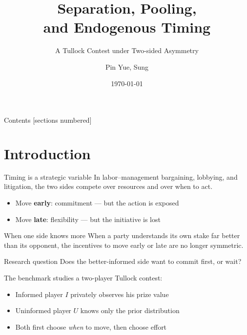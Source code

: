 \documentclass[10pt]{beamer}
\title{Separation, Pooling,\\ and Endogenous Timing}
\subtitle{A Tullock Contest under Two-sided Asymmetry}
\date{\today}
\author{Pin Yue, Sung}
\institute{Dept. of International Business, National Chengchi University}
\let\focusoldcitet\citet
\renewcommand{\citet}[1]{\textcolor{alert}{\focusoldcitet{#1}}}%
\begin{document}
\maketitle

\begin{frame}{Contents}
  [sections numbered]
  \tableofcontents[hideallsubsections]
\end{frame}

\section{Introduction}

\begin{frame}{Timing is a strategic variable}
  In labor--management bargaining, lobbying, and litigation, the two
  sides compete over resources \alert{and over when to act}.

  \begin{itemize}
    \item Move \textbf{early}: commitment --- but the action is exposed
    \item Move \textbf{late}: flexibility --- but the initiative is lost
  \end{itemize}
\end{frame}

\begin{frame}{When one side knows more}
  When a party understands its own stake far better than its opponent,
  the incentives to move early or late are no longer symmetric.

  \begin{block}{Research question}
    Does the better-informed side want to commit first, or wait?
  \end{block}
\end{frame}

\begin{frame}{The benchmark}
  \citet{fu2006} studies a two-player Tullock contest:
  \begin{itemize}
    \item Informed player $I$ privately observes his prize value
    \item Uninformed player $U$ knows only the prior distribution
    \item Both first choose \emph{when} to move, then choose effort
  \end{itemize}
\end{frame}
\end{document}
